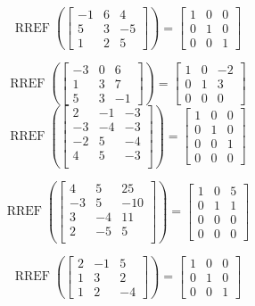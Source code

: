 \documentclass{article}
\DeclareMathOperator{\RREF}{RREF}
\begin{document}
\[
  \RREF\left(
    \begin{bmatrix} 
-1 & 6 & 4 \\ 
5 & 3 & -5 \\ 
1 & 2 & 5 
\end{bmatrix}
  \right)
    =
  \begin{bmatrix} 1 & 0 &0 \\ 0 & 1 & 0 \\ 0 & 0 & 1\end{bmatrix}
\]


\[
  \RREF\left(
    \begin{bmatrix} -3 & 0 & 6 \\ 1 & 3 & 7 \\ 5 & 3 & -1 \end{bmatrix}
  \right)
    =
  \begin{bmatrix} 1 & 0 & -2 \\ 0 & 1 & 3 \\ 0 & 0 & 0\end{bmatrix}
\]
%
\[
  \RREF\left(
    \begin{bmatrix} 2 & -1 & -3 \\ -3 & -4 & -3 \\ -2 & 5 & -4 \\ 4 & 5 & -3 \\ \end{bmatrix}
  \right)
    =
  \begin{bmatrix} 1 & 0 & 0 \\ 0 & 1 & 0 \\ 0 & 0 & 1 \\ 0 & 0 & 0 \end{bmatrix}
\]


\[
  \RREF\left(
    \begin{bmatrix} 4 & 5 & 25 \\ -3 & 5 & -10 \\ 3 & -4 & 11 \\ 2 & -5 & 5 \\ \end{bmatrix}
  \right)
    =
  \begin{bmatrix} 1 & 0 & 5 \\ 0 & 1 & 1 \\ 0 & 0 & 0 \\ 0 & 0 & 0 \end{bmatrix}
\]

\[
  \RREF\left(
    \begin{bmatrix} 2 & -1 & 5 \\ 1 & 3 & 2 \\ 1 & 2 & -4 \end{bmatrix}
  \right)
    =
  \begin{bmatrix} 1 & 0 &0 \\ 0 & 1 & 0 \\ 0 & 0 & 1\end{bmatrix}
\]
\end{document}
